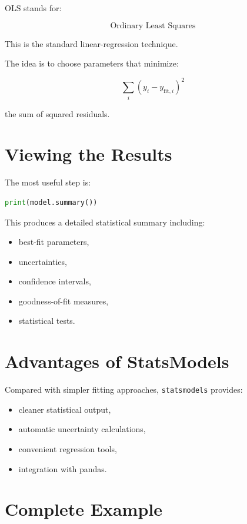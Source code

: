 \documentclass[11pt]{article}
\begin{document}
OLS stands for:

\[
\text{Ordinary Least Squares}
\]

This is the standard linear-regression technique.

The idea is to choose parameters that minimize:

\[
\sum_i (y_i - y_{\mathrm{fit},i})^2
\]

the sum of squared residuals.

\section{Viewing the Results}

The most useful step is:

\begin{lstlisting}[language=Python]
print(model.summary())
\end{lstlisting}

This produces a detailed statistical summary including:

\begin{itemize}
    \item best-fit parameters,
    \item uncertainties,
    \item confidence intervals,
    \item goodness-of-fit measures,
    \item statistical tests.
\end{itemize}

\section{Advantages of StatsModels}

Compared with simpler fitting approaches, \texttt{statsmodels} provides:

\begin{itemize}
    \item cleaner statistical output,
    \item automatic uncertainty calculations,
    \item convenient regression tools,
    \item integration with pandas.
\end{itemize}

\section{Complete Example}
\end{document}
